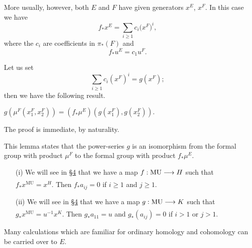 \documentclass[../main]{subfiles}
\begin{document}
More usually, however, both $E$ and $F$ have given generators $x^E$, $x^F$. In this case we have \[f_\ast x^E = \sum_{i \ge 1} c_i \big(x^F\big)^i,\] where the $c_i$ are coefficients in $\pi_\ast(F)$ and
\begin{equation}
\tag{2.12}
\label{eqn:p2c02.12}
f_\ast u^E = c_1 u^F.
\end{equation}

Let us set \[\sum_{i \ge 1} c_i (x^F)^i = g(x^F);\] then we have the following result. 

\begin{customlemma}{2.13}
\label{lem:p2c02.13}
$g(\mu^F(x_1^F, x_2^F)) = (f_\ast \mu^E) (g(x_1^F), g(x_2^F))$.
\end{customlemma}

The proof is immediate, by naturality. 

This lemma states that the power-series $g$ is an isomorphism from the formal group with product $\mu^F$ to the formal group with product $f_\ast \mu^E$. 

\begin{examples}
\begin{enumerate}
    \item[(i)] We will see in \hyperref[sec:p2c4]{\S 4} that we have a map $f : \mathrm{MU} \lar{} H$ such that $f_\ast x^{\mathrm{MU}} = x^H$. Then $f_\ast a_{ij} = 0$ if $i \ge 1$ and $j \ge 1$.
    \item[(ii)] We will see in \hyperref[sec:p2c4]{\S 4} that we have a map $g : \mathrm{MU} \lar{} K$ such that $g_\ast x^{\mathrm{MU}} = u^{-1} x^K$. Then $g_\ast a_{11} = u$ and $g_\ast(a_{ij}) = 0$ if $i > 1$ or $j > 1$.
\end{enumerate}
\end{examples}

Many calculations which are familiar for ordinary homology and cohomology can be carried over to $E$. 
\end{document}
